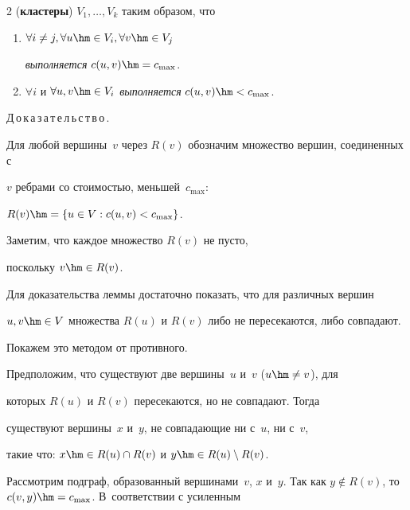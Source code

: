 \begin{multicols}{2}
{(\textbf{кластеры}) $V_1,\ldots , V_k$ таким образом, что}


\begin{enumerate}


\item


$\forall i \neq j, \forall u \hm\in V_i, \forall v\hm \in V_j$


\textit{выполняется} $c(u,v)\hm=c_{\max}$.


\item


$\forall i$ и $ \forall u,v \hm\in V_i$ \textit{выполняется} $c(u,v)\hm < c_{\max}$.


\end{enumerate}





\smallskip





\noindent


Д\,о\,к\,а\,з\,а\,т\,е\,л\,ь\,с\,т\,в\,о\,.\ \


Для любой вершины~$v$ через $R(v)$ обозначим множество вершин, соединенных с


$v$ ребрами со стоимостью, меньшей~$c_{\max}$:


$R(v) \hm= \{u \in V : c(u,v) < c_{\max}\}$.


Заметим, что каждое множество $R(v)$ не пусто,


поскольку $v \hm\in R(v)$.


Для доказательства леммы достаточно показать, что для различных вершин


$u,v \hm\in V$ множества $R(u)$ и $R(v)$ либо не пересекаются, либо совпадают.


Покажем это методом от противного.





Предположим, что существуют две вершины~$u$ и~$v$ ($u \hm\neq v$), для


которых $R(u)$ и $R(v)$ пересекаются, но не совпадают. Тогда


существуют вершины~$x$ и~$y$, не совпадающие ни с~$u$, ни с~$v$,


такие что: $x \hm\in R(u) \cap R(v)$ и $y \hm\in R(u) \setminus R(v)$.


Рассмотрим подграф, образованный вершинами~$v$, $x$ и~$y$. Так как $y


\not\in R(v)$, то $c(v,y)\hm=c_{\max}$. В~соответствии с усиленным



\end{multicols}
